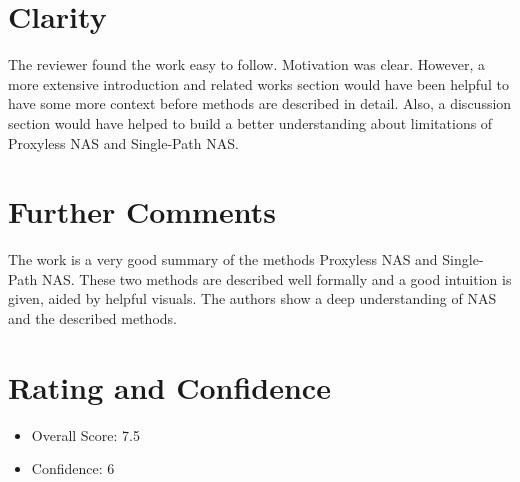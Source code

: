\documentclass[a4paper]{scrartcl}
\begin{document}
\section*{Clarity}
The reviewer found the work easy to follow. Motivation was clear.
However, a more extensive introduction and related works section would have been helpful to have some more context before methods are described in detail. Also, a discussion section would have helped to build a better understanding about limitations of Proxyless NAS and Single-Path NAS.


\section*{Further Comments}
The work is a very good summary of the methods Proxyless NAS and Single-Path NAS. These two methods are described well formally and a good intuition is given, aided by helpful visuals. The authors show a deep understanding of NAS and the described methods. 



\section*{Rating and Confidence}
\begin{itemize}
	\item Overall Score: 7.5
	\item Confidence: 6
\end{itemize}




	
\end{document}
